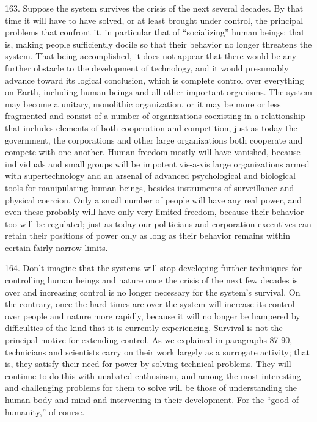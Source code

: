 \documentclass{article}
\begin{document}
163. Suppose the system survives the crisis of the next several decades. By that time it will have 
to have solved, or at least brought under control, the principal problems that confront it, in 
particular that of “socializing” human beings; that is, making people sufficiently docile so that 
their behavior no longer threatens the system. That being accomplished, it does not appear that 
there would be any further obstacle to the development of technology, and it would presumably 
advance toward its logical conclusion, which is complete control over everything on Earth, 
including human beings and all other important organisms. The system may become a unitary, 
monolithic organization, or it may be more or less fragmented and consist of a number of 
organizations coexisting in a relationship that includes elements of both cooperation and 
competition, just as today the government, the corporations and other large organizations both 
cooperate and compete with one another. Human freedom mostly will have vanished, because 
individuals and small groups will be impotent vis-a-vis large organizations armed with 
supertechnology and an arsenal of advanced psychological and biological tools for manipulating 
human beings, besides instruments of surveillance and physical coercion. Only a small number of 
people will have any real power, and even these probably will have only very limited freedom, 
because their behavior too will be regulated; just as today our politicians and corporation 
executives can retain their positions of power only as long as their behavior remains within certain 
fairly narrow limits. \vspace{\baselineskip}

164. Don’t imagine that the systems will stop developing further techniques for controlling human 
beings and nature once the crisis of the next few decades is over and increasing control is no longer 
necessary for the system’s survival. On the contrary, once the hard times are over the system will 
increase its control over people and nature more rapidly, because it will no longer be hampered by 
difficulties of the kind that it is currently experiencing. Survival is not the principal motive for 
extending control. As we explained in paragraphs 87-90, technicians and scientists carry on their 
work largely as a surrogate activity; that is, they satisfy their need for power by solving technical 
problems. They will continue to do this with unabated enthusiasm, and among the most interesting 
and challenging problems for them to solve will be those of understanding the human body and 
mind and intervening in their development. For the “good of humanity,” of course. \vspace{\baselineskip}
\end{document}
